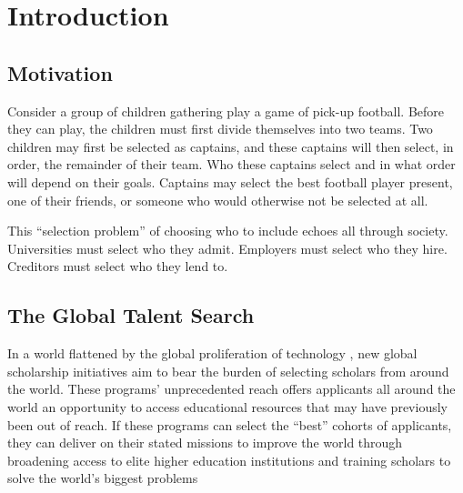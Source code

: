

\chapter{\label{ch:intro}Introduction} 

\minitoc

\section{Motivation}
Consider a group of children gathering play a game of pick-up football. Before they can play, the children must first divide themselves into two teams. Two children may first be selected as captains, and these captains will then select, in order, the remainder of their team. Who these captains select and in what order will depend on their goals. Captains may select the best football player present, one of their friends, or someone who would otherwise not be selected at all.

This ``selection problem'' of choosing who to include echoes all through society. Universities must select who they admit. Employers must select who they hire. Creditors must select who they lend to. 




\section{The Global Talent Search}
In a world flattened by the global proliferation of technology \cite{Friedman_2005}, new global scholarship initiatives aim to bear the burden of selecting scholars from around the world. These programs' unprecedented reach offers applicants all around the world an opportunity to access educational resources that may have previously been out of reach. If these programs can select the ``best'' cohorts of applicants, they can deliver on their stated missions to improve the world through broadening access to elite higher education institutions and training scholars to solve the world's biggest problems

